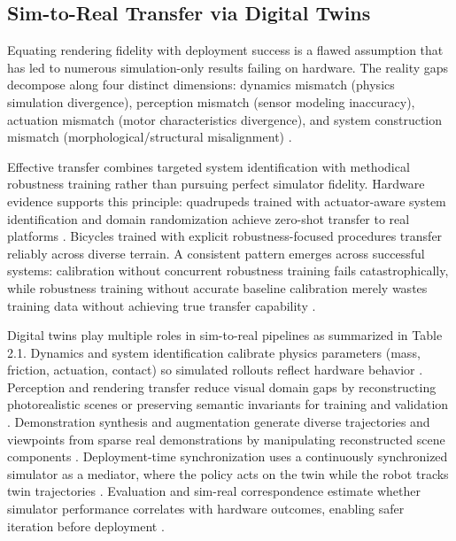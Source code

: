 ﻿\documentclass[12pt,a4paper,oneside]{report}
\begin{document}
\subsection{Sim-to-Real Transfer via Digital Twins}

Equating rendering fidelity with deployment success is a flawed assumption that has led to numerous simulation-only results failing on hardware. The reality gaps decompose along four distinct dimensions: dynamics mismatch (physics simulation divergence), perception mismatch (sensor modeling inaccuracy), actuation mismatch (motor characteristics divergence), and system construction mismatch (morphological/structural misalignment) \cite{tan2018simtoreal}.

Effective transfer combines targeted system identification with methodical robustness training rather than pursuing perfect simulator fidelity. Hardware evidence supports this principle: quadrupeds trained with actuator-aware system identification and domain randomization achieve zero-shot transfer to real platforms \cite{tan2018simtoreal}. Bicycles trained with explicit robustness-focused procedures transfer reliably across diverse terrain. A consistent pattern emerges across successful systems: calibration without concurrent robustness training fails catastrophically, while robustness training without accurate baseline calibration merely wastes training data without achieving true transfer capability \cite{tan2018simtoreal}.

Digital twins play multiple roles in sim-to-real pipelines as summarized in Table 2.1. Dynamics and system identification calibrate physics parameters (mass, friction, actuation, contact) so simulated rollouts reflect hardware behavior \cite{tan2018simtoreal, heiden2022inferring, lou2026drex}. Perception and rendering transfer reduce visual domain gaps by reconstructing photorealistic scenes or preserving semantic invariants for training and validation \cite{qureshi2025splatsim, tang2025semantic}. Demonstration synthesis and augmentation generate diverse trajectories and viewpoints from sparse real demonstrations by manipulating reconstructed scene components \cite{yang2025robosplat, yu2025real2render2real}. Deployment-time synchronization uses a continuously synchronized simulator as a mediator, where the policy acts on the twin while the robot tracks twin trajectories \cite{abou2024realissim}. Evaluation and sim-real correspondence estimate whether simulator performance correlates with hardware outcomes, enabling safer iteration before deployment \cite{jain2025polaris, li2024simpler}.
\end{document}
